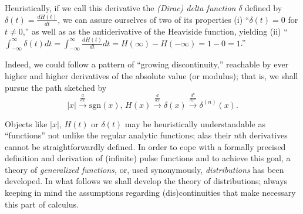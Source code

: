 Heuristically, if we call this derivative the {\em (Dirac) delta function} $\delta$ defined by
$\delta (t)= \frac{d H(t)}{dt}$,
we can assure ourselves of two of its properties
(i) ``$\delta (t) =0$ for $t\neq 0$,''
as well as as the antiderivative of the Heaviside function, yielding
(ii) ``$\int_{-\infty}^\infty \delta (t) dt  = \int_{-\infty}^\infty \frac{d H(t)}{dt} dt  =
H(\infty ) - H(-\infty ) = 1-0=1$.''


Indeed, we could follow a pattern of ``growing discontinuity,''
reachable by ever higher and higher derivatives of the
absolute value (or modulus); that is, we shall pursue the path sketched by
$$
\vert x\vert
\stackrel{\frac{d}{dx}  }{  \longrightarrow}
\textrm{sgn}(x) ,\,
H(x)
\stackrel{\frac{d}{dx} }{ \longrightarrow}
\delta (x)
\stackrel{\frac{d^n}{dx^n} }{ \longrightarrow}
\delta^{(n)} (x)
.
$$



Objects like $\vert x\vert$,  $H(t)$ or $\delta (t)$ may be heuristically understandable
as ``functions'' not unlike
the regular analytic functions; alas
their $n$th derivatives cannot be straightforwardly defined.
In order to cope with a formally precised definition
and derivation of (infinite) pulse functions and to achieve this goal,
a theory of  {\em  generalized functions,}
or, used synonymously,
{\em distributions}
has been developed.
In what follows we shall
develop the theory of distributions;
always keeping in mind the assumptions
regarding (dis)continuities
that make necessary this part of calculus.

